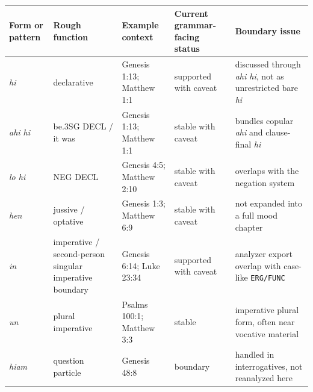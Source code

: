 \documentclass[
  11pt,
  a4paper,
]{article}
\newcounter{none} %
\newcommand{\tdim}[1]{\textit{#1}}
\begin{document}
{\def\LTcaptype{none} %
\begin{longtable}[]{@{}
  >{\raggedright\arraybackslash}p{}
  >{\raggedright\arraybackslash}p{}
  >{\raggedright\arraybackslash}p{}
  >{\raggedright\arraybackslash}p{}
  >{\raggedright\arraybackslash}p{}@{}}
\toprule\noalign{}
\begin{minipage}[b]{\linewidth}\raggedright
Form or pattern
\end{minipage} & \begin{minipage}[b]{\linewidth}\raggedright
Rough function
\end{minipage} & \begin{minipage}[b]{\linewidth}\raggedright
Example context
\end{minipage} & \begin{minipage}[b]{\linewidth}\raggedright
Current grammar-facing status
\end{minipage} & \begin{minipage}[b]{\linewidth}\raggedright
Boundary issue
\end{minipage} \\
\midrule\noalign{}
\endhead
\bottomrule\noalign{}
\endlastfoot
\tdim{hi} & declarative & Genesis 1:13; Matthew 1:1 & supported with
caveat & discussed through \tdim{ahi hi}, not as unrestricted bare
\tdim{hi} \\
\tdim{ahi hi} & be.3SG DECL / it was & Genesis 1:13; Matthew 1:1 &
stable with caveat & bundles copular \tdim{ahi} and clause-final
\tdim{hi} \\
\tdim{lo hi} & NEG DECL & Genesis 4:5; Matthew 2:10 & stable with caveat
& overlaps with the negation system \\
\tdim{hen} & jussive / optative & Genesis 1:3; Matthew 6:9 & stable with
caveat & not expanded into a full mood chapter \\
\tdim{in} & imperative / second-person singular imperative boundary &
Genesis 6:14; Luke 23:34 & supported with caveat & analyzer export
overlap with case-like \texttt{ERG/FUNC} \\
\tdim{un} & plural imperative & Psalms 100:1; Matthew 3:3 & stable &
imperative plural form, often near vocative material \\
\tdim{hiam} & question particle & Genesis 48:8 & boundary & handled in
interrogatives, not reanalyzed here \\

\end{longtable}}
\end{document}

